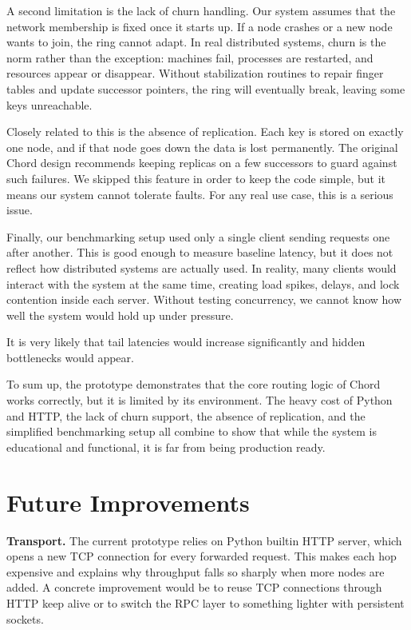\documentclass[conference]{IEEEtran}
\begin{document}
A second limitation is the lack of churn handling. Our system assumes that the network membership is fixed once it starts up. If a node crashes or a new node wants to join, the ring cannot adapt. In real distributed systems, churn is the norm rather than the exception: machines fail, processes are restarted, and resources appear or disappear. Without stabilization routines to repair finger tables and update successor pointers, the ring will eventually break, leaving some keys unreachable. 

Closely related to this is the absence of replication. Each key is stored on exactly one node, and if that node goes down the data is lost permanently. The original Chord design recommends keeping replicas on a few successors to guard against such failures. We skipped this feature in order to keep the code simple, but it means our system cannot tolerate faults. For any real use case, this is a serious issue.

Finally, our benchmarking setup used only a single client sending requests one after another. This is good enough to measure baseline latency, but it does not reflect how distributed systems are actually used. In reality, many clients would interact with the system at the same time, creating load spikes, delays, and lock contention inside each server. Without testing concurrency, we cannot know how well the system would hold up under pressure. 

It is very likely that tail latencies would increase significantly and hidden bottlenecks would appear.

To sum up, the prototype demonstrates that the core routing logic of Chord works correctly, but it is limited by its environment. The heavy cost of Python and HTTP, the lack of churn support, the absence of replication, and the simplified benchmarking setup all combine to show that while the system is educational and functional, it is far from being production ready.


\section{Future Improvements}
\textbf{Transport.}  
The current prototype relies on Python builtin HTTP server, which opens a new TCP connection for every forwarded request. This makes each hop expensive and explains why throughput falls so sharply when more nodes are added. A concrete improvement would be to reuse TCP connections through HTTP keep alive or to switch the RPC layer to something lighter with persistent sockets. 
\end{document}
